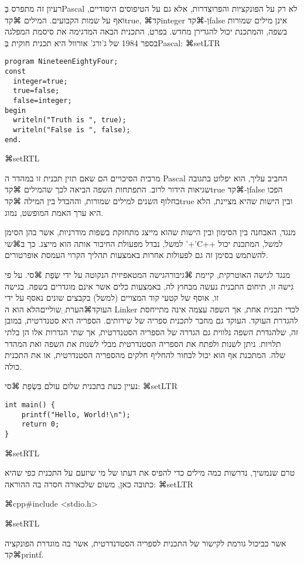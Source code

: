 {רעיון זה מתפרס בְּPascal לא רק על הפונקציות והפרוצדרות, אלא גם על הטיפוסים היסודיים, ואף על שמות הקבועים. המילים ⌘קד{true}, ⌘קד{integer} וְ-⌘קד{false}  אינן מילים שמורות בשפה, והמתכנת יכול להגדירן מחדש. בפרט, התכנית הבאה המדגימה את סיסמת המפלגה בספר 1984 של ג'ורג' אורוול היא תכנית חוקית בְּPascal:
⌘setLTR{}
\lstset{language=Pascal}
\begin{lstlisting}[frame=single]
program NineteenEightyFour;
const
  integer=true;
  true=false;
  false=integer; 
begin
  writeln("Truth is ", true);
  writeln("False is ", false);
end.
\end{lstlisting}
⌘setRTL{}

מרבית הסיכויים הם שאם תזין תכנית זו במהדר ה Pascal החביב עליך, הוא יפלוט בתגובה שגיאות הידור לרוב. התפתחות השפה הביאה לכך שהמילים ⌘קד{true} וְ-⌘קד{false} הפכו בחלוף השנים למילים שמורות, וההבדל בין המילה ⌘קד{true} ובין הישות שהיא מציינת, הלא היא ערך האמת המופשט, נמוג.

מנגד, האבחנה בין הסימון ובין הישות שהוא מייצג מתחזקת בשפות מודרניות, אשר בהן הסימן '+' למשל, נבדל מפעולת החיבור אותה הוא מייצג. כך ב⌘שי{C++} למשל, המתכנת יכול להשתמש בסימן זה גם לפעולות אחרות באמצעות תהליך הקרוי העמסת אופרטורים.

מנגד לגישה האוטרקית, קיימת ⌘גיבור{הגישה המטאפיזית} הנקוטה על ידי שְׂפַת ⌘סי. על פי גישה זו, תיחום התכנית נעשה מבחוץ לה, באמצעות כלים אשר אינם מוגדרים בשפה. בגישה זו, אוסף של קטעי קוד המצויים (למשל) בקבצים שונים נאסף על ידי העוקד⌘הערת␣שוליים{הלא הוא ה Linker} לכדי תכנית אחת, אך השפה עצמה אינה מתייחסת להגדרת העוקד. העוקד גם מחבר לתכנית ספריה של שירותים. הספריה היא סטנדרטית, במובן זה, שלהגדרת השפה נלווית גם הגדרה של הספריה הסטנדרטית, אך שתי הגדרות אלו הן בלתי תלויות. ניתן לשנות ולפתח את הספריה הסטנדרטית מבלי לשנות את השפה ואת המהדר שלה. המתכנת אף הוא יכול לבחור להחליף חלקים מהספריה הסטנדרטית, או את התכנית כולה. 

נעיין כעת בתכנית שלום עולם בִּשְׂפַת ⌘סי: 
⌘setLTR{}
\lstset{language=C}
\begin{lstlisting}[frame=single]
int main() {
	printf("Hello, World!\n");
	return 0;	
}
\end{lstlisting}
⌘setRTL{}

טרם שנמשיך, נדרשות כמה מילים כדי להפיס את דעתו של מי שיזעם על התכנית כפי שהיא כתובה כאן, משום שלכאורה חסרה בה ההוראה:
⌘setLTR{}

⌘cpp{#include <stdio.h>}

⌘setRTL{}

אשר כביכול גורמת לקישור של התכנית לספריה הסטדנדרטית, אשר בה מוגדרת הפונקציה ⌘קד{printf}. 

}
